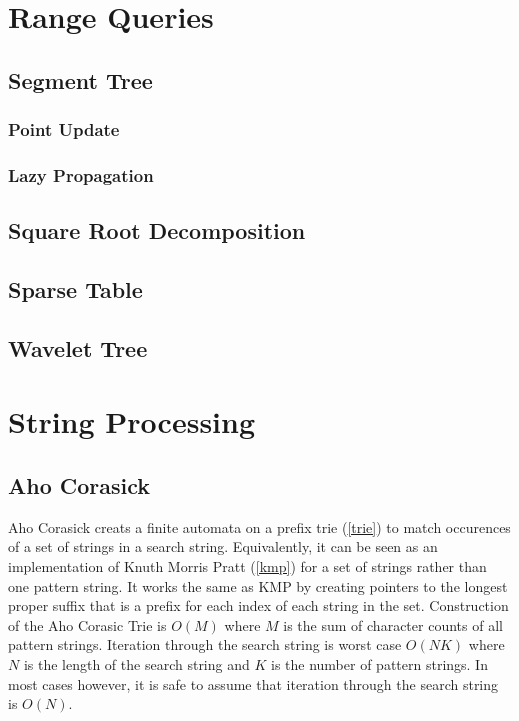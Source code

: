\documentclass[letterpaper,11pt,twoside]{article}
\begin{document}
        \section{Range Queries}
            \subsection{Segment Tree}
                \subsubsection{Point Update}
                \subsubsection{Lazy Propagation}
            \subsection{Square Root Decomposition}
            \subsection{Sparse Table}
            \subsection{Wavelet Tree}

        \section{String Processing}
            \subsection{Aho Corasick}
                Aho Corasick creats a finite automata on a prefix trie (\ref{trie}) to match occurences of a set of strings in a search string.
                Equivalently, it can be seen as an implementation of Knuth Morris Pratt (\ref{kmp}) for a set of strings rather than one pattern string.
                It works the same as KMP by creating pointers to the longest proper suffix that is a prefix for each index of each string in the set.
                Construction of the Aho Corasic Trie is $O(M)$ where $M$ is the sum of character counts of all pattern strings.
                Iteration through the search string is worst case $O(NK)$ where $N$ is the length of the search string and $K$ is the number of pattern strings.
                In most cases however, it is safe to assume that iteration through the search string is $O(N)$.
\end{document}
